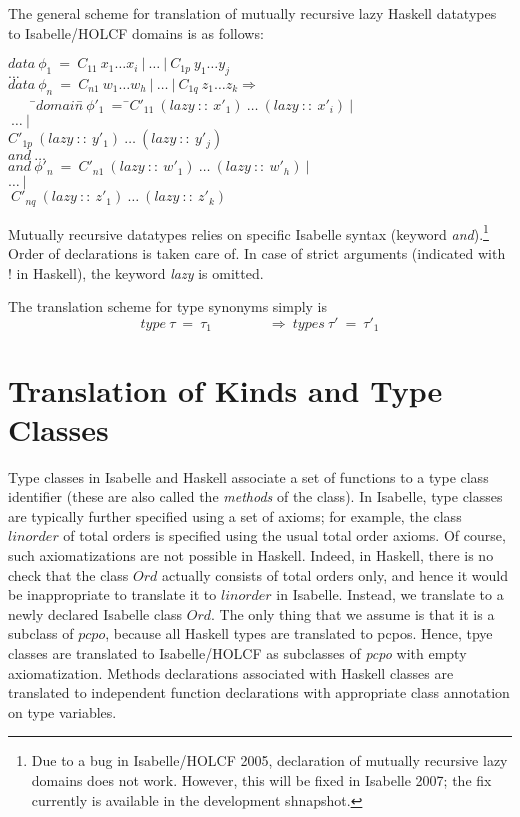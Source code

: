 \documentclass{llncs}
\begin{document}
The general scheme for translation of mutually recursive lazy Haskell
datatypes to Isabelle/HOLCF domains is as follows:
\begin{tabbing}
$ data \ \phi_1 \ = \ C_{11} \ x_1 \ldots x_i
  \ | \ \ldots \ | \ C_{1p} \ y_1 \ldots y_j $ \\
$ \ldots $ \\
$ data \ \phi_n \ = \ C_{n1} \ w_1 \ldots w_h
  \ | \ \ldots \ | \ C_{1q} \ z_1 \ldots z_k \Longrightarrow $ \\
$  \qquad $\=$ domain$\=$ \ \phi'_1 \ = \  $\=$ C'_{11} \ (lazy~ ::\ x'_1) \ \ldots \ (lazy~ :: \ 
  x'_i) \ |$\\
\>\>\>$ \ \ldots \ | \ $\\
\>\>\>$ C'_{1p} \ 
  (lazy~ :: \ y'_1) \ \ldots \ (lazy~ :: \ y'_j) $\\
\>$  and \ \ldots $\\
\>$  and \ $\>$\phi'_n \ = \ C'_{n1} \ (lazy~ :: \ w'_1) \ \ldots \ (lazy~ :: \ 
  w'_h) \ | \ $\\
\>\>\>$\ldots \ | $\\
\>\>\>$\  C'_{nq} \ 
  (lazy~ :: \ z'_1) \ \ldots \ (lazy~ :: \ z'_k) $\\
\end{tabbing}
Mutually recursive datatypes relies on specific Isabelle syntax
(keyword \emph{and}).\footnote {Due to a bug in Isabelle/HOLCF 2005,
  declaration of mutually recursive lazy domains does not work.
  However, this will be fixed in Isabelle 2007; the fix currently is
  available in the development shnapshot.} Order of declarations is
taken care of. In case of strict arguments (indicated with ! in
Haskell), the keyword \emph{lazy} is omitted.

The translation scheme for type synonyms simply is
$$  type \ \tau \ = \ \tau_1 \qquad \qquad \Longrightarrow
  \ types \ \tau' \ = \ \tau'_1 
$$


\section{Translation of Kinds and Type Classes}

Type classes in Isabelle and Haskell associate a set of functions to a
type class identifier (these are also called the \emph{methods} of the
class). In Isabelle, type classes are typically further specified
using a set of axioms; for example, the class
$\mathit{linorder}$ of total orders is specified using the
usual total order axioms. Of course, such axiomatizations are not
possible in Haskell. Indeed, in Haskell, there is no check that the
class $Ord$ actually consists of total orders only, and hence it would
be inappropriate to translate it to $\mathit{linorder}$ in Isabelle.
Instead, we translate to a newly declared Isabelle class $Ord$.
The only thing that we assume is that it is a subclass of $pcpo$,
because all Haskell types are translated to pcpos.
Hence, tpye classes are translated to Isabelle/HOLCF as subclasses of
\emph{pcpo} with empty axiomatization.
Methods declarations associated with
Haskell classes are translated to independent function declarations with
appropriate class annotation on type variables. 
\end{document}
